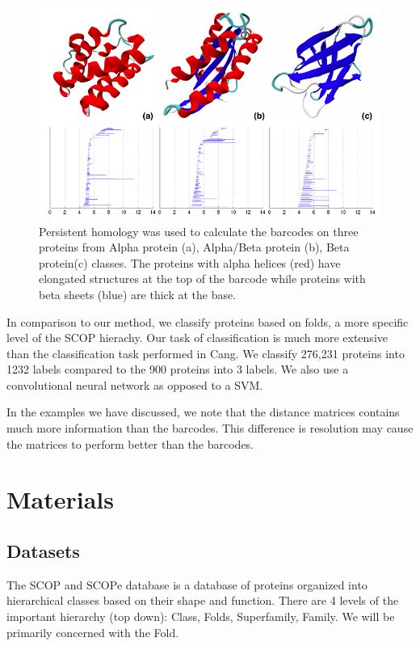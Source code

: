 \documentclass[12pt, a4paper, twocolumn, fullpage]{article}
\theoremstyle{plain}
\theoremstyle{definition}
\theoremstyle{remark}
\begin{document}
\begin{figure}
	\centering
    \includegraphics[width=.8\linewidth]{img/hom/scopHom.png}
    \caption{Persistent homology was used to calculate the barcodes on three proteins from Alpha protein (a), Alpha/Beta protein (b), Beta protein(c) classes. The proteins with alpha helices (red) have elongated structures at the top of the barcode while proteins with beta sheets (blue) are thick at the base.}
    \label{fig:scopHom}
\end{figure}
 In comparison to our method, we classify proteins based on folds, a more specific level of the SCOP hierachy. Our task of classification is much more extensive than the classification task performed in Cang. We classify 276,231 proteins into 1232 labels compared to the 900 proteins into 3 labels. We also use a convolutional neural network as opposed to a SVM. 
 
In the examples we have discussed, we note that the distance matrices contains much more information than the barcodes. This difference is resolution may cause the matrices to perform better than the barcodes.

\section{Materials}

\subsection{Datasets}

The SCOP and SCOPe database is a database of proteins organized into hierarchical classes based on their shape and function. There are 4 levels of the important hierarchy (top down): Class, Folds, Superfamily, Family. We will be primarily concerned with the Fold.
\end{document}
